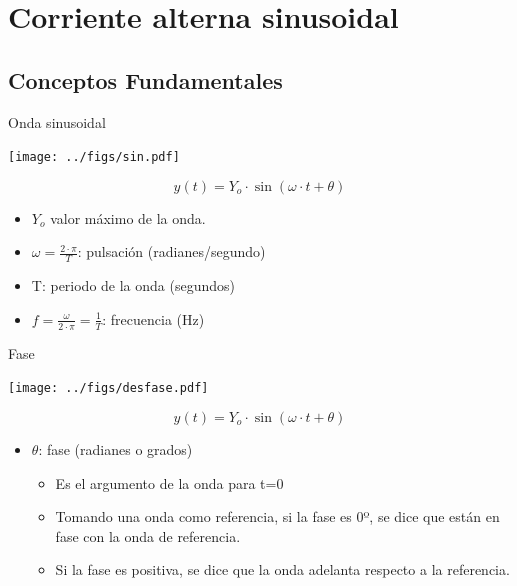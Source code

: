 \documentclass[xcolor={usenames,svgnames,dvipsnames}]{beamer}
\begin{document}
\section{Corriente alterna sinusoidal}
\label{sec:orge76eef3}

\subsection{Conceptos Fundamentales}
\label{sec:org0761f84}

\begin{frame}[label={sec:org2d7a525}]{Onda sinusoidal}
\begin{center}
\texttt{[image: ../figs/sin.pdf]}
\end{center}


\[
y(t)=Y_{o}\cdot\sin(\omega\cdot t+\theta)
\]

\begin{itemize}
\item \(Y_{o}\) valor máximo de la onda.

\item \(\omega=\frac{2\cdot\pi}{T}\): pulsación (radianes/segundo)

\item T: periodo de la onda (segundos)

\item \(f=\frac{\omega}{2\cdot\pi}=\frac{1}{T}\): frecuencia (Hz)
\end{itemize}
\end{frame}


\begin{frame}[label={sec:org19e619e}]{Fase}
\begin{center}
\texttt{[image: ../figs/desfase.pdf]}
\end{center}


\[
y(t)=Y_{o}\cdot\sin(\omega\cdot t+\theta)
\]

\begin{itemize}
\item \(\theta\): fase (radianes o grados)

\begin{itemize}
\item Es el argumento de la onda para t=0

\item Tomando una onda como referencia, si la fase es 0º, se dice que
están en fase con la onda de referencia.

\item Si la fase es positiva, se dice que la onda adelanta
respecto a la referencia.
\end{itemize}
\end{itemize}
\end{frame}
\end{document}
